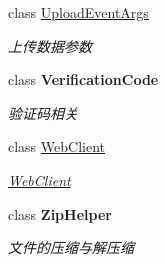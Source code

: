 \begin{DoxyCompactItemize}
class \hyperlink{class_x_c_l_net_tools_1_1_file_handler_1_1_upload_event_args}{Upload\+Event\+Args}
\begin{DoxyCompactList}\small\item\em 上传数据参数 \end{DoxyCompactList}\item 
class {\bfseries Verification\+Code}
\begin{DoxyCompactList}\small\item\em 验证码相关 \end{DoxyCompactList}\item 
class \hyperlink{class_x_c_l_net_tools_1_1_file_handler_1_1_web_client}{Web\+Client}
\begin{DoxyCompactList}\small\item\em \hyperlink{class_x_c_l_net_tools_1_1_file_handler_1_1_web_client}{Web\+Client} \end{DoxyCompactList}\item 
class {\bfseries Zip\+Helper}
\begin{DoxyCompactList}\small\item\em 文件的压缩与解压缩 \end{DoxyCompactList}\end{DoxyCompactItemize}
